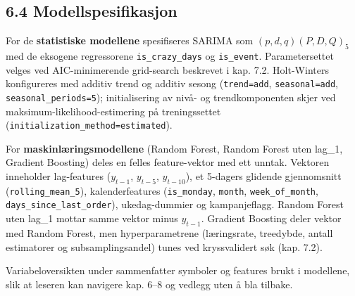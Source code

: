 \documentclass[
  norsk,
  11pt,
  a4paper,
]{article}
\begin{document}
\subsection{6.4 Modellspesifikasjon}\label{modellspesifikasjon}

For de \textbf{statistiske modellene} spesifiseres SARIMA som
\((p,d,q)(P,D,Q)_5\) med de eksogene regressorene
\texttt{is\_crazy\_days} og \texttt{is\_event}. Parametersettet velges
ved AIC-minimerende grid-search beskrevet i kap. 7.2. Holt-Winters
konfigureres med additiv trend og additiv sesong
(\texttt{trend=\textquotesingle{}add\textquotesingle{}},
\texttt{seasonal=\textquotesingle{}add\textquotesingle{}},
\texttt{seasonal\_periods=5}); initialisering av nivå- og
trendkomponenten skjer ved maksimum-likelihood-estimering på
treningssettet
(\texttt{initialization\_method=\textquotesingle{}estimated\textquotesingle{}}).

For \textbf{maskinlæringsmodellene} (Random Forest, Random Forest uten
lag\_1, Gradient Boosting) deles en felles feature-vektor med ett
unntak. Vektoren inneholder lag-features (\(y_{t-1}\), \(y_{t-5}\),
\(y_{t-10}\)), et 5-dagers glidende gjennomsnitt
(\texttt{rolling\_mean\_5}), kalenderfeatures (\texttt{is\_monday},
\texttt{month}, \texttt{week\_of\_month},
\texttt{days\_since\_last\_order}), ukedag-dummier og kampanjeflagg.
Random Forest uten lag\_1 mottar samme vektor minus \(y_{t-1}\).
Gradient Boosting deler vektor med Random Forest, men hyperparametrene
(læringsrate, treedybde, antall estimatorer og subsamplingsandel) tunes
ved kryssvalidert søk (kap. 7.2).

Variabeloversikten under sammenfatter symboler og features brukt i
modellene, slik at leseren kan navigere kap. 6--8 og vedlegg uten å bla
tilbake.
\end{document}
